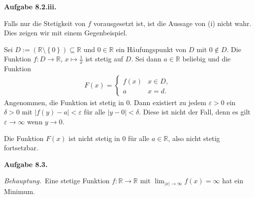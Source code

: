 \documentclass[12pt]{extarticle}
\newcommand{\beh}{\textit{Behauptung.}\ }
\newcommand{\aufgn}[1]{\textbf{Aufgabe #1.}}
\newcommand{\mg}[1]{\mathbb{#1}}
\begin{document}
\aufgn{8.2.iii}

Falls nur die Stetigkeit von \(f\) vorausgesetzt ist, ist
die Aussage von (i) nicht wahr.  Dies zeigen wir mit
einem Gegenbeispiel.

Sei
$D:=(\mg{R} \setminus \left\{ 0 \right\}) \subseteq
\mg{R}$ und \(0 \in \mg{R}\) ein Häufungspunkt von \(D\)
mit \(0 \notin D\).  Die Funktion \(f: D \to \mg{R}\),
\(x \mapsto \frac{1}{x}\) ist stetig auf \(D\).  Sei dann
\(a \in \mg{R}\) beliebig und die Funktion
\begin{align*}
  F(x) =
\begin{cases}
  f(x) & x \in D, \\
  a & x = d.
\end{cases}
\end{align*}
Angenommen, die Funktion ist stetig in \(0\).  Dann
existiert zu jedem \(\varepsilon > 0\) ein \(\delta > 0\)
mit \(\left| f(y) - a \right| < \varepsilon\) für alle
\(\left| y-0 \right| < \delta\).  Diese ist nicht der
Fall, denn es gilt \(\varepsilon \to \infty\) wenn
\(y \to 0\).

Die Funktion \(F(x)\) ist nicht stetig in \(0\) für alle
\(a \in \mg{R}\), also nicht stetig fortsetzbar.

\aufgn{8.3}

\beh Eine stetige Funktion \(f \colon \mg{R} \to \mg{R}\)
mit \(\lim_{\left| x \right| \to \infty}{f(x)}=\infty\)
hat ein Minimum.
\end{document}
